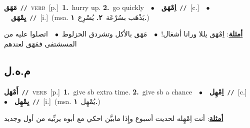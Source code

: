 \documentclass[10pt,a4paper,twoside]{article} %
\begin{document}
\begin{multicols}{2}
{\setlength\topsep{0pt}\textbf{\foreignlanguage{arabic}{مَهَق}}\ {\color{gray}\texttt{//}\color{black}}\ \textsc{verb}\ [p.]\ \textbf{1.}~hurry up.  \textbf{2.}~go quickly\ \ $\bullet$\ \ \setlength\topsep{0pt}\textbf{\foreignlanguage{arabic}{اِمْهَق}}\ {\color{gray}\texttt{//}\color{black}}\ [c.]\ \ $\bullet$\ \ \setlength\topsep{0pt}\textbf{\foreignlanguage{arabic}{يِمْهَق}}\ {\color{gray}\texttt{//}\color{black}}\ [i.]\ \color{gray}(msa. \foreignlanguage{arabic}{يَذْهَب بسُرْعَة}~\foreignlanguage{arabic}{\textbf{٢.}}  \foreignlanguage{arabic}{يُسْرِع}~\foreignlanguage{arabic}{\textbf{١.}})\color{black}\  \begin{flushright}\color{gray}\foreignlanguage{arabic}{\textbf{\underline{\foreignlanguage{arabic}{أمثلة}}}: اِمْهَق يللا ورانا أشغال!\ $\bullet$\ \  مَهَق بالأكل وتشردق الحزلوط\ $\bullet$\ \  اتصلوا عليه من المسشتفى فمَهَق لعندهم}\end{flushright}\color{black}} \vspace{2mm}

\vspace{-3mm}
\subsection*{\color{blue}\foreignlanguage{arabic}{م.ه.ل}\color{blue}{}} 

{\setlength\topsep{0pt}\textbf{\foreignlanguage{arabic}{أَمْهَل}}\ {\color{gray}\texttt{//}\color{black}}\ \textsc{verb}\ [p.]\ \textbf{1.}~give sb extra time.  \textbf{2.}~give sb a chance\ \ $\bullet$\ \ \setlength\topsep{0pt}\textbf{\foreignlanguage{arabic}{اِمْهِل}}\ {\color{gray}\texttt{//}\color{black}}\ [c.]\ \ $\bullet$\ \ \setlength\topsep{0pt}\textbf{\foreignlanguage{arabic}{يِمْهِل}}\ {\color{gray}\texttt{//}\color{black}}\ [i.]\ \color{gray}(msa. \foreignlanguage{arabic}{يُمْهِل}~\foreignlanguage{arabic}{\textbf{١.}})\color{black}\  \begin{flushright}\color{gray}\foreignlanguage{arabic}{\textbf{\underline{\foreignlanguage{arabic}{أمثلة}}}: أنت اِمْهِله لحديت أسبوع وإِذا مابيَّن احكي مع أبوه يربِّيه من أول وجديد}\end{flushright}\color{black}} \vspace{2mm}


\end{multicols}
\end{document}
